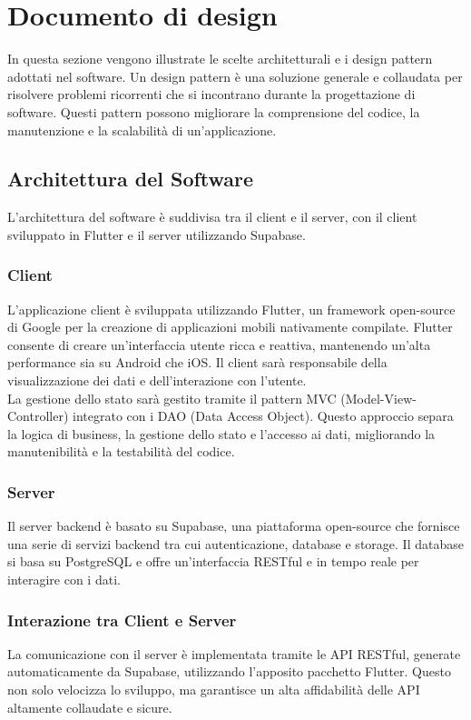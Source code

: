 \chapter{Documento di design}
In questa sezione vengono illustrate le scelte architetturali e i design pattern adottati nel software.
Un design pattern è una soluzione generale e collaudata per risolvere problemi ricorrenti che si incontrano durante la progettazione di software.
Questi pattern possono migliorare la comprensione del codice, la manutenzione e la scalabilità di un'applicazione.

\bigskip\bigskip

\section{Architettura del Software}
L'architettura del software è suddivisa tra il client e il server, con il client sviluppato in Flutter e il server utilizzando Supabase.

\subsection{Client}
L'applicazione client è sviluppata utilizzando Flutter, un framework open-source di Google per la creazione di applicazioni mobili nativamente compilate. Flutter consente di creare un'interfaccia utente ricca e reattiva, mantenendo un'alta performance sia su Android che iOS.\meskip
Il client sarà responsabile della visualizzazione dei dati e dell'interazione con l'utente.\\
La gestione dello stato sarà gestito tramite il pattern MVC (Model-View-Controller) integrato con i DAO (Data Access Object). 
Questo approccio separa la logica di business, la gestione dello stato e l'accesso ai dati, migliorando la manutenibilità e la testabilità del codice.

\subsection{Server}
Il server backend è basato su Supabase, una piattaforma open-source che fornisce una serie di servizi backend tra cui autenticazione, database e storage. Il database si basa su PostgreSQL e offre un'interfaccia RESTful e in tempo reale per interagire con i dati.

\subsection{Interazione tra Client e Server}
La comunicazione con il server è implementata tramite le API RESTful, generate automaticamente da Supabase, utilizzando l'apposito pacchetto Flutter. Questo non solo velocizza lo sviluppo, ma garantisce un alta affidabilità delle API altamente collaudate e sicure.


